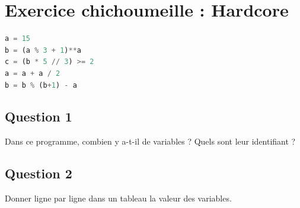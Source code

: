 \section*{Exercice chichoumeille : Hardcore}
\begin{lstlisting}[style=pythonstyle, language=Python]
a = 15
b = (a % 3 + 1)**a
c = (b * 5 // 3) >= 2
a = a + a / 2
b = b % (b+1) - a
\end{lstlisting}
\subsection*{Question 1}
Dans ce programme, combien y a-t-il de variables ? Quels sont leur identifiant ?

\subsection*{Question 2}
Donner ligne par ligne dans un tableau la valeur des variables.